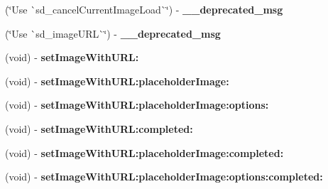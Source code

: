 \begin{DoxyCompactItemize}
(\char`\"{}Use \`{}sd\+\_\+cancel\+Current\+Image\+Load\`{}\char`\"{}) -\/ {\bfseries \+\_\+\+\_\+deprecated\+\_\+msg}
\item 
\mbox{\label{category_u_i_image_view_07_web_cache_deprecated_08_abce1b9f769f99947aa3b2829fb1a977a}} 
(\char`\"{}Use \`{}sd\+\_\+image\+U\+RL\`{}\char`\"{}) -\/ {\bfseries \+\_\+\+\_\+deprecated\+\_\+msg}
\item 
\mbox{\label{category_u_i_image_view_07_web_cache_deprecated_08_ab266b5f32655763bcc040d89fde5515f}} 
(void) -\/ {\bfseries set\+Image\+With\+U\+R\+L\+:}
\item 
\mbox{\label{category_u_i_image_view_07_web_cache_deprecated_08_aa8fe46f136bc683f2b9a1774f3b14c1e}} 
(void) -\/ {\bfseries set\+Image\+With\+U\+R\+L\+:placeholder\+Image\+:}
\item 
\mbox{\label{category_u_i_image_view_07_web_cache_deprecated_08_a64439251752a3e6d05ea0048f890de20}} 
(void) -\/ {\bfseries set\+Image\+With\+U\+R\+L\+:placeholder\+Image\+:options\+:}
\item 
\mbox{\label{category_u_i_image_view_07_web_cache_deprecated_08_ae63378d5e281f75357307ae22b214288}} 
(void) -\/ {\bfseries set\+Image\+With\+U\+R\+L\+:completed\+:}
\item 
\mbox{\label{category_u_i_image_view_07_web_cache_deprecated_08_abe4ed894259f4e7c6e67075befcd23c8}} 
(void) -\/ {\bfseries set\+Image\+With\+U\+R\+L\+:placeholder\+Image\+:completed\+:}
\item 
\mbox{\label{category_u_i_image_view_07_web_cache_deprecated_08_ab6d74e590766c217b23f326339591e1d}} 
(void) -\/ {\bfseries set\+Image\+With\+U\+R\+L\+:placeholder\+Image\+:options\+:completed\+:}
\item 
\mbox{\label{category_u_i_image_view_07_web_cache_deprecated_08_a828f2953a000953933379e6400acad98}} 

\end{DoxyCompactItemize}
